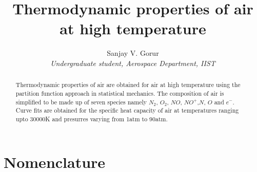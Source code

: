 \documentclass[]{aelab_aiaa-tc}%
\title{Thermodynamic properties of air at high temperature\\
        }
\author{
  Sanjay V. Gorur
  \\{\normalsize\itshape
   Undergraduate student, Aerospace Department, IIST}\\
  \and
 }
\begin{document}
\maketitle



\begin{abstract}
	
	Thermodynamic properties of air are obtained for air at high temperature using the partition function approach in statistical mechanics. The composition of air is simplified to be made up of seven species namely $N_2$, $O_2$, $NO$, $NO^+$,$N$, $O$ and $e^-$. Curve fits are obtained for the specific heat capacity of air at temperatures ranging upto 30000K and presurres varying from 1atm to 90atm.
	
\end{abstract}

\section*{Nomenclature}
\end{document}
